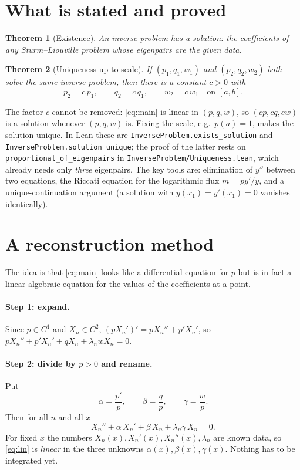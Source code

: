 \documentclass[11pt]{article}
\newtheorem{theorem}{Theorem}
\theoremstyle{remark}
\begin{document}
\section{What is stated and proved}

\begin{theorem}[Existence]
An inverse problem has a solution: the coefficients of any Sturm--Liouville
problem whose eigenpairs are the given data.
\end{theorem}

\begin{theorem}[Uniqueness up to scale]\label{thm:unique}
If $(p_1,q_1,w_1)$ and $(p_2,q_2,w_2)$ both solve the same inverse problem,
then there is a constant $c>0$ with
\[
  p_2=c\,p_1,\qquad q_2=c\,q_1,\qquad w_2=c\,w_1 \quad\text{on }[a,b].
\]
\end{theorem}

The factor $c$ cannot be removed: \eqref{eq:main} is linear in $(p,q,w)$, so
$(cp,cq,cw)$ is a solution whenever $(p,q,w)$ is. Fixing the scale, e.g.\
$p(a)=1$, makes the solution unique. In Lean these are
\texttt{InverseProblem.exists\_solution} and
\texttt{InverseProblem.solution\_unique}; the proof of the latter rests on
\texttt{proportional\_of\_eigenpairs} in
\texttt{InverseProblem/Uniqueness.lean}, which already needs only
\emph{three} eigenpairs. The key tools are: elimination of $y''$ between two
equations, the Riccati equation for the logarithmic flux $m=py'/y$, and a
unique-continuation argument (a solution with $y(x_1)=y'(x_1)=0$ vanishes
identically).

\section{A reconstruction method}

The idea is that \eqref{eq:main} looks like a differential equation for $p$ but
is in fact a linear algebraic equation for the values of the coefficients at a
point.

\paragraph{Step 1: expand.}
Since $p\in C^1$ and $X_n\in C^2$, $(pX_n')'=pX_n''+p'X_n'$, so
$pX_n''+p'X_n'+qX_n+\lambda_nwX_n=0$.

\paragraph{Step 2: divide by $p>0$ and rename.}
Put
\[
  \alpha=\frac{p'}{p},\qquad \beta=\frac{q}{p},\qquad \gamma=\frac{w}{p}.
\]
Then for all $n$ and all $x$
\begin{equation}\label{eq:lin}
  X_n''+\alpha\,X_n'+\beta\,X_n+\lambda_n\gamma\,X_n=0 .
\end{equation}
For fixed $x$ the numbers $X_n(x),X_n'(x),X_n''(x),\lambda_n$ are known data,
so \eqref{eq:lin} is \emph{linear} in the three unknowns
$\alpha(x),\beta(x),\gamma(x)$. Nothing has to be integrated yet.
\end{document}
